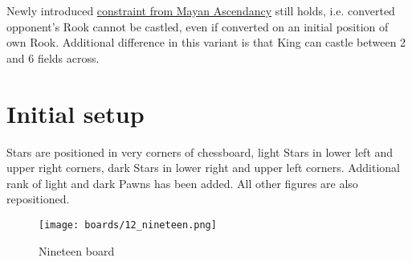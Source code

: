 \vspace*{-0.7\baselineskip}
Newly introduced
\hyperref[sec:Mayan Ascendancy/Pyramid/Conversion/Converting Rooks]{constraint from Mayan Ascendancy}
still holds, i.e. converted opponent's Rook cannot be castled, even if converted on
an initial position of own Rook. Additional difference in this variant is that King
can castle between 2 and 6 fields across.

\clearpage %

\section*{Initial setup}
\label{sec:Nineteen/Initial setup}

Stars are positioned in very corners of chessboard, light Stars in lower left and upper right
corners, dark Stars in lower right and upper left corners. Additional rank of light and dark
Pawns has been added. All other figures are also repositioned.

\noindent
\begin{figure}[h]
\texttt{[image: boards/12\_nineteen.png]}
\caption{Nineteen board}
\label{fig:12_nineteen}
\end{figure}

\clearpage %
